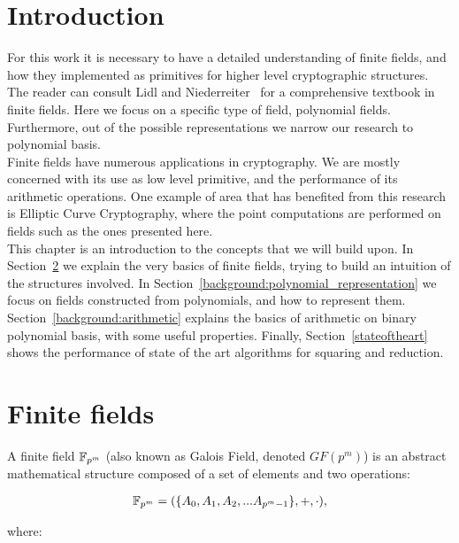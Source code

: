 \section{Introduction}

For this work it is necessary to have a detailed understanding of finite fields, and how they implemented as primitives for higher level cryptographic structures. The reader can consult Lidl and Niederreiter~\cite{lidl1997finite} for a comprehensive textbook in finite fields. Here we focus on a specific type of field, polynomial fields. Furthermore, out of the possible representations we narrow our research to polynomial basis. \\

Finite fields have numerous applications in cryptography. We are mostly concerned with its use as low level primitive, and the performance of its arithmetic operations. One example of area that has benefited from this research is Elliptic Curve Cryptography, where the point computations are performed on fields such as the ones presented here. \\

This chapter is an introduction to the concepts that we will build upon. In Section~\ref{background:finite_fields} we explain the very basics of finite fields, trying to build an intuition of the structures involved. In Section~\ref{background:polynomial_representation} we focus on fields constructed from polynomials, and how to represent them. Section~\ref{background:arithmetic} explains the basics of arithmetic on binary polynomial basis, with some useful properties. Finally, Section~\ref{stateoftheart} shows the performance of state of the art algorithms for squaring and reduction. \\

\section{Finite fields} \label{background:finite_fields}

A finite field $\mathbb{F}_{p^m}$ (also known as Galois Field, denoted $GF(p^m)$) is an abstract mathematical structure composed of a set of elements and two operations: 

\begin{gather*}
\mathbb{F}_{p^m} = (\{A_0, A_1, A_2, ... A_{p^m-1}\}, +, \cdot),
\end{gather*}

where:

